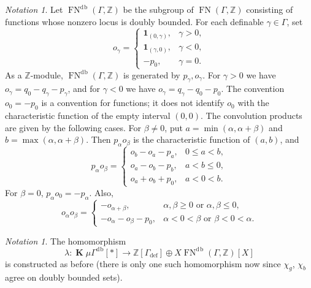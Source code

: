 \documentclass[12pt]{amsart}
\theoremstyle{plain}
\theoremstyle{definition}
\theoremstyle{remark}
\newtheorem{nota}[thm]{Notation}
\numberwithin{equation}{section}
\theoremstyle{plain}
\newcommand{\Z}{\mathds{Z}}
\newcommand{\0}{\emptyset}
\newcommand{\fun}{\longrightarrow}
\newcommand{\mG}{{\mu}{\Gamma}}
\DeclareMathOperator{\ggk}{\mathbf{K}}
\DeclareMathOperator{\fn}{FN}
\DeclareMathOperator{\db}{d \! b}
\begin{document}
\begin{nota}\label{db:generator}
Let $\fn^{\db}(\Gamma,\Z)$ be the subgroup of $\fn(\Gamma,\Z)$ consisting of functions whose nonzero locus is doubly bounded. For each definable $\gamma\in\Gamma$, set
\[
o_\gamma=\begin{cases}
\mathbf1_{(0,\gamma)},&\gamma>0,\\
\mathbf1_{(\gamma,0)},&\gamma<0,\\
-p_0,&\gamma=0.
\end{cases}
\]
As a $\Z$-module, $\fn^{\db}(\Gamma,\Z)$ is generated by $p_\gamma,o_\gamma$. For $\gamma>0$ we have $o_\gamma=q_0-q_\gamma-p_\gamma$, and for $\gamma<0$ we have $o_\gamma=q_\gamma-q_0-p_0$. The convention $o_0=-p_0$ is a convention for functions; it does not identify $o_0$ with the characteristic function of the empty interval $(0,0)$. The convolution products are given by the following cases.
For $\beta\ne0$, put $a=\min(\alpha,\alpha+\beta)$ and $b=\max(\alpha,\alpha+\beta)$. Then $p_\alpha o_\beta$ is the characteristic function of $(a,b)$, and
\[
p_\alpha o_\beta=\begin{cases}
o_b-o_a-p_a,&0\leq a<b,\\
o_a-o_b-p_b,&a<b\leq0,\\
o_a+o_b+p_0,&a<0<b.
\end{cases}
\]
For $\beta=0$, $p_\alpha o_0=-p_\alpha$. Also,
\[
o_\alpha o_\beta=\begin{cases}
-o_{\alpha+\beta},&\alpha,\beta\geq0\text{ or }\alpha,\beta\leq0,\\
-o_\alpha-o_\beta-p_0,&\alpha<0<\beta\text{ or }\beta<0<\alpha.
\end{cases}
\]
\end{nota}


\begin{nota}\label{db:gam:fn}
The homomorphism
\begin{equation*}
\lambda : \ggk \mG^{\db}[*] \fun \Z[\Gamma_{\mathrm{def}}] \oplus X \fn^{\db}(\Gamma, \Z)[X]
\end{equation*}
is constructed as before (there is only one such homomorphism now since  $\chi_{g}$, $\chi_{b}$ agree on doubly bounded sets).
\end{nota}
\end{document}
